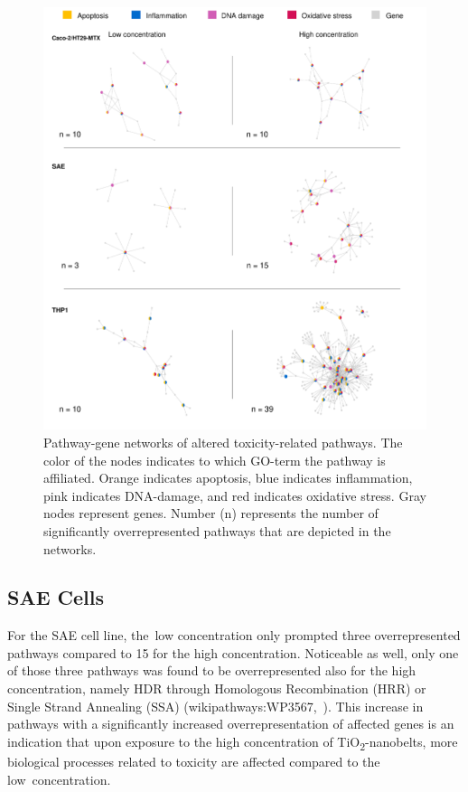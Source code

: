 \documentclass[ijms,article,accept,moreauthors,pdftex]{Definitions/mdpi}
\begin{document}
\begin{paracol}{2}
\begin{figure}[H]
\includegraphics[width=1\linewidth]{fig2.pdf}
  \caption{Pathway-gene networks of altered toxicity-related pathways.
   The color of the nodes indicates to which GO-term the pathway is affiliated. Orange indicates apoptosis, blue indicates inflammation, pink indicates DNA-damage, and 
   red %
   indicates oxidative stress. Gray nodes represent genes. Number (n) represents the number of significantly overrepresented pathways that are depicted in the networks.}
\label{fig:fig2}
\end{figure}
\unskip
\subsection{SAE Cells}
For the SAE cell line, the~low concentration only prompted three overrepresented pathways compared to 15 for the high concentration. Noticeable as well, only one of those three pathways was found to be overrepresented also for the high concentration, namely HDR through Homologous Recombination (HRR) or Single Strand Annealing (SSA) (wikipathways:WP3567,~\cite{WP3567}). This increase in pathways with a significantly increased overrepresentation of affected genes is an indication that upon exposure to the high concentration of TiO\textsubscript{2}-nanobelts, more biological processes related to toxicity are affected compared to the low~concentration. 


\end{paracol}
\end{document}
